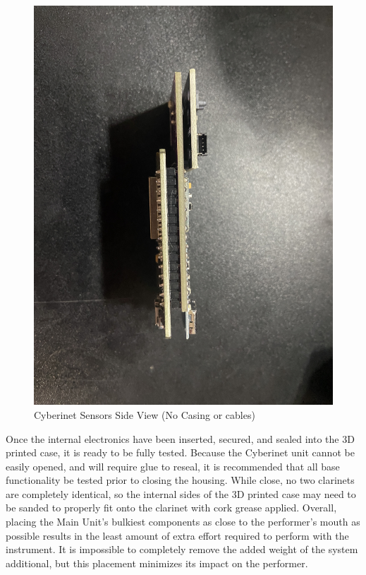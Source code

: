 \begin{center}
    \begin{figure}
        \centering
        \includegraphics[scale=0.05]{diagrams/PCBs/cyberinetThin.JPG}
        \caption{Cyberinet Sensors Side View (No Casing or cables)}
        \label{fig:Cyberinetside}
    \end{figure}
\end{center}

Once the internal electronics have been inserted, secured, and sealed into the 3D printed case, it is ready to be fully tested. Because the Cyberinet unit cannot be easily opened, and will require glue to reseal, it is recommended that all base functionality be tested prior to closing the housing. While close, no two clarinets are completely identical, so the internal sides of the 3D printed case may need to be sanded to properly fit onto the clarinet with cork grease applied. Overall, placing the Main Unit's bulkiest components as close to the performer's mouth as possible results in the least amount of extra effort required to perform with the instrument. It is impossible to completely remove the added weight of the system additional, but this placement minimizes its impact on the performer.



